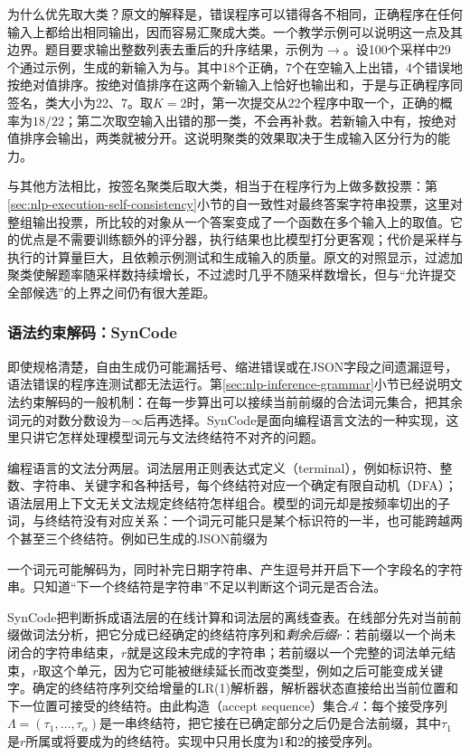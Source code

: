 为什么优先取大类？原文的解释是，错误程序可以错得各不相同，正确程序在任何输入上都给出相同输出，因而容易汇聚成大类。一个教学示例可以说明这一点及其边界。题目要求输出整数列表去重后的升序结果，示例为\code{[3,1,3]}$\to$\code{[1,3]}。设100个采样中29个通过示例，生成的新输入为\code{[]}与\code{[2,-1,2,5]}。其中18个正确，7个在空输入上出错，4个错误地按绝对值排序。按绝对值排序在这两个新输入上恰好也输出\code{[]}和\code{[-1,2,5]}，于是与正确程序同签名，类大小为22、7。取$K=2$时，第一次提交从22个程序中取一个，正确的概率为$18/22$；第二次取空输入出错的那一类，不会再补救。若新输入中有\code{[-3,1]}，按绝对值排序会输出\code{[1,-3]}，两类就被分开。这说明聚类的效果取决于生成输入区分行为的能力。

与其他方法相比，按签名聚类后取大类，相当于在程序行为上做多数投票：第\ref{sec:nlp-execution-self-consistency}小节的自一致性对最终答案字符串投票，这里对整组输出投票，所比较的对象从一个答案变成了一个函数在多个输入上的取值。它的优点是不需要训练额外的评分器，执行结果也比模型打分更客观；代价是采样与执行的计算量巨大，且依赖示例测试和生成输入的质量。原文的对照显示，过滤加聚类使解题率随采样数持续增长，不过滤时几乎不随采样数增长，但与“允许提交全部候选”的上界之间仍有很大差距。

\subsubsection{语法约束解码：SynCode}
\label{sec:nlp-execution-syncode}

即使规格清楚，自由生成仍可能漏括号、缩进错误或在JSON字段之间遗漏逗号，语法错误的程序连测试都无法运行。第\ref{sec:nlp-inference-grammar}小节已经说明文法约束解码的一般机制：在每一步算出可以接续当前前缀的合法词元集合，把其余词元的对数分数设为$-\infty$后再选择。SynCode是面向编程语言文法的一种实现，这里只讲它怎样处理模型词元与文法终结符不对齐的问题。

编程语言的文法分两层。词法层用正则表达式定义（terminal），例如标识符、整数、字符串、关键字和各种括号，每个终结符对应一个确定有限自动机（DFA）；语法层用上下文无关文法规定终结符怎样组合。模型的词元却是按频率切出的子词，与终结符没有对应关系：一个词元可能只是某个标识符的一半，也可能跨越两个甚至三个终结符。例如已生成的JSON前缀为
\begin{quote}
\end{quote}
一个词元可能解码为，同时补完日期字符串、产生逗号并开启下一个字段名的字符串。只知道“下一个终结符是字符串”不足以判断这个词元是否合法。

SynCode把判断拆成语法层的在线计算和词法层的离线查表。在线部分先对当前前缀做词法分析，把它分成已经确定的终结符序列和\emph{剩余后缀}$r$：若前缀以一个尚未闭合的字符串结束，$r$就是这段未完成的字符串；若前缀以一个完整的词法单元结束，$r$取这个单元，因为它可能被继续延长而改变类型，例如之后可能变成关键字。确定的终结符序列交给增量的LR(1)解析器，解析器状态直接给出当前位置和下一位置可接受的终结符。由此构造（accept sequence）集合$\mathcal A$：每个接受序列$\Lambda=(\tau_1,\ldots,\tau_\alpha)$是一串终结符，把它接在已确定部分之后仍是合法前缀，其中$\tau_1$是$r$所属或将要成为的终结符。实现中只用长度为1和2的接受序列。

